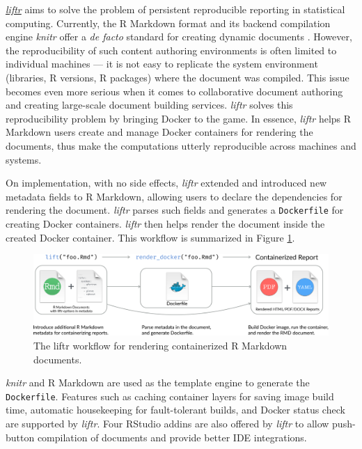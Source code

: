 \href{https://nanx.me/liftr/}{\emph{liftr}} \citep{liftr2019} aims to
solve the problem of persistent reproducible reporting in statistical
computing. Currently, the R Markdown format and its backend compilation
engine \emph{knitr} offer a \emph{de facto} standard for creating
dynamic documents \citep{xie2018}. However, the reproducibility of such
content authoring environments is often limited to individual machines
--- it is not easy to replicate the system environment (libraries, R
versions, R packages) where the document was compiled. This issue
becomes even more serious when it comes to collaborative document
authoring and creating large-scale document building services.
\emph{liftr} solves this reproducibility problem by bringing Docker to
the game. In essence, \emph{liftr} helps R Markdown users create and
manage Docker containers for rendering the documents, thus make the
computations utterly reproducible across machines and systems.

On implementation, with no side effects, \emph{liftr} extended and
introduced new metadata fields to R Markdown, allowing users to declare
the dependencies for rendering the document. \emph{liftr} parses such
fields and generates a \texttt{Dockerfile} for creating Docker
containers. \emph{liftr} then helps render the document inside the
created Docker container. This workflow is summarized in Figure
\ref{figure:liftr}.

\begin{figure}[htbp]
  \centering
  \includegraphics[width=\textwidth]{liftr-workflow}
  \caption{The liftr workflow for rendering containerized R Markdown documents.}
  \label{figure:liftr}
\end{figure}

\emph{knitr} and R Markdown are used as the template engine to generate
the \texttt{Dockerfile}. Features such as caching container layers for
saving image build time, automatic housekeeping for fault-tolerant
builds, and Docker status check are supported by \emph{liftr}. Four
RStudio addins are also offered by \emph{liftr} to allow push-button
compilation of documents and provide better IDE integrations.

